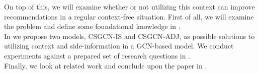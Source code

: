 On top of this, we will examine whether or not utilizing this context can improve recommendations in a regular context-free situation.
First of all, we will examine the problem and define some foundational knowledge in .\\
In  we propose two models, CSGCN-IS and CSGCN-ADJ, as possible solutions to utilizing context and side-information in a GCN-based model.
We conduct experiments against a prepared set of research questions in .\\
Finally, we look at related work and conclude upon the paper in .
\\\\
